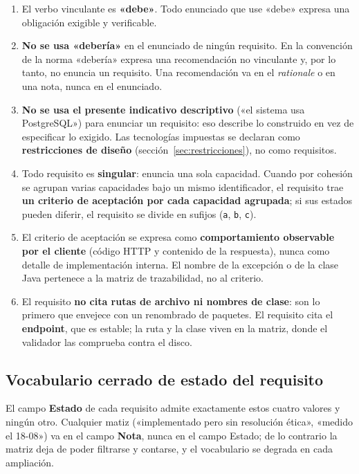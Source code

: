 \documentclass[11pt,a4paper]{article}
\begin{document}
\begin{enumerate}
    \item El verbo vinculante es \textbf{«debe»}. Todo enunciado que use «debe» expresa una
          obligación exigible y verificable.
    \item \textbf{No se usa «debería»} en el enunciado de ningún requisito. En la convención de
          la norma «debería» expresa una recomendación no vinculante y, por lo tanto, no enuncia
          un requisito. Una recomendación va en el \emph{rationale} o en una nota, nunca en el
          enunciado.
    \item \textbf{No se usa el presente indicativo descriptivo} («el sistema usa PostgreSQL»)
          para enunciar un requisito: eso describe lo construido en vez de especificar lo
          exigido. Las tecnologías impuestas se declaran como \textbf{restricciones de diseño}
          (sección~\ref{sec:restricciones}), no como requisitos.
    \item Todo requisito es \textbf{singular}: enuncia una sola capacidad. Cuando por cohesión
          se agrupan varias capacidades bajo un mismo identificador, el requisito trae
          \textbf{un criterio de aceptación por cada capacidad agrupada}; si sus estados pueden
          diferir, el requisito se divide en sufijos (\texttt{a}, \texttt{b}, \texttt{c}).
    \item El criterio de aceptación se expresa como \textbf{comportamiento observable por el
          cliente} (código HTTP y contenido de la respuesta), nunca como detalle de
          implementación interna. El nombre de la excepción o de la clase Java pertenece a la
          matriz de trazabilidad, no al criterio.
    \item El requisito \textbf{no cita rutas de archivo ni nombres de clase}: son lo primero que
          envejece con un renombrado de paquetes. El requisito cita el \textbf{endpoint}, que es
          estable; la ruta y la clase viven en la matriz, donde el validador las comprueba
          contra el disco.
\end{enumerate}

\subsection{Vocabulario cerrado de estado del requisito}
\label{sec:estados-req}

El campo \textbf{Estado} de cada requisito admite exactamente estos cuatro valores y ningún
otro. Cualquier matiz («implementado pero sin resolución ética», «medido el 18-08») va en el
campo \textbf{Nota}, nunca en el campo Estado; de lo contrario la matriz deja de poder
filtrarse y contarse, y el vocabulario se degrada en cada ampliación.
\end{document}

